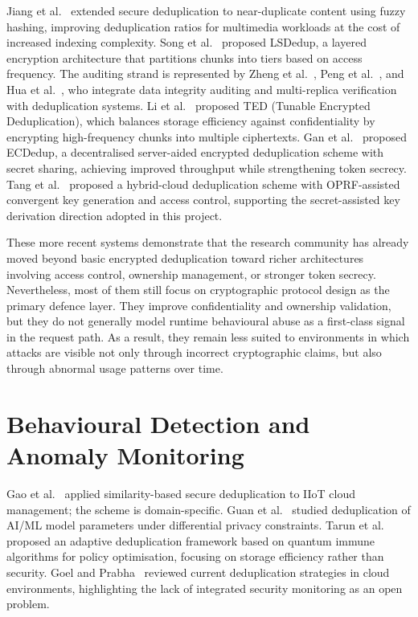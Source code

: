 \documentclass[12pt,a4paper,oneside]{report}
\begin{document}
Jiang et al.~\cite{jiang2023} extended secure deduplication to near-duplicate content using fuzzy hashing, improving deduplication ratios for multimedia workloads at the cost of increased indexing complexity.
Song et al.~\cite{song2024} proposed LSDedup, a layered encryption architecture that partitions chunks into tiers based on access frequency.
The auditing strand is represented by Zheng et al.~\cite{zheng2025}, Peng et al.~\cite{peng2025}, and Hua et al.~\cite{hua2025}, who integrate data integrity auditing and multi-replica verification with deduplication systems.
Li et al.~\cite{li2020} proposed TED (Tunable Encrypted Deduplication), which balances storage efficiency against confidentiality by encrypting high-frequency chunks into multiple ciphertexts.
Gan et al.~\cite{gan2025} proposed ECDedup, a decentralised server-aided encrypted deduplication scheme with secret sharing, achieving improved throughput while strengthening token secrecy.
Tang et al.~\cite{tang2024} proposed a hybrid-cloud deduplication scheme with OPRF-assisted convergent key generation and access control, supporting the secret-assisted key derivation direction adopted in this project.

These more recent systems demonstrate that the research community has already moved beyond basic encrypted deduplication toward richer architectures involving access control, ownership management, or stronger token secrecy.
Nevertheless, most of them still focus on cryptographic protocol design as the primary defence layer.
They improve confidentiality and ownership validation, but they do not generally model runtime behavioural abuse as a first-class signal in the request path.
As a result, they remain less suited to environments in which attacks are visible not only through incorrect cryptographic claims, but also through abnormal usage patterns over time.

\section{Behavioural Detection and Anomaly Monitoring}

Gao et al.~\cite{gao2024} applied similarity-based secure deduplication to IIoT cloud management; the scheme is domain-specific.
Guan et al.~\cite{guan2025} studied deduplication of AI/ML model parameters under differential privacy constraints.
Tarun et al.~\cite{tarun2025} proposed an adaptive deduplication framework based on quantum immune algorithms for policy optimisation, focusing on storage efficiency rather than security.
Goel and Prabha~\cite{goel2025} reviewed current deduplication strategies in cloud environments, highlighting the lack of integrated security monitoring as an open problem.
\end{document}

